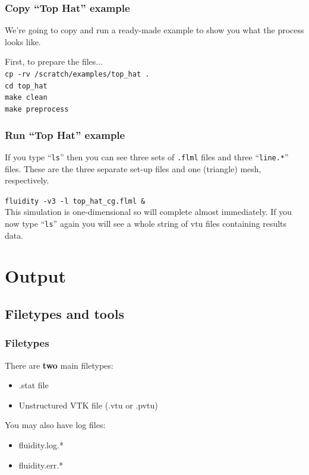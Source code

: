 \documentclass[12pt]{beamer}
\begin{document}
\begin{frame}
    \frametitle{Copy ``Top Hat'' example}

We're going to copy and run a ready-made example to show you what the process looks like.

\vspace{5mm}
First, to prepare the files...\\
{\tt cp -rv /scratch/examples/top\_hat .}\\
{\tt cd top\_hat}\\
{\tt make clean}\\
{\tt make preprocess}

\end{frame}

\begin{frame}
    \frametitle{Run ``Top Hat'' example}

If you type ``{\tt ls}'' then you can see three sets of {\tt .flml} files and three ``{\tt line.*}'' files.
These are the three separate set-up files and one (triangle) mesh, respectively.

\vspace{5mm}
{\tt fluidity -v3 -l top\_hat\_cg.flml \&}\\
\vspace{5mm}
This simulation is one-dimensional so will complete almost immediately.  
If you now type ``{\tt ls}'' again you will see a whole string of vtu files containing results data.

\end{frame}

\section{Output}

\subsection{Filetypes and tools}
\begin{frame}
    \frametitle{Filetypes}
There are \textbf{two} main filetypes:
\begin{itemize}
    \item .stat file
    \item Unstructured VTK file (.vtu or .pvtu)
\end{itemize}
\vspace{5mm}
You may also have log files:
\begin{itemize}
    \item fluidity.log.*
    \item fluidity.err.*
\end{itemize}

\end{frame}
\end{document}
